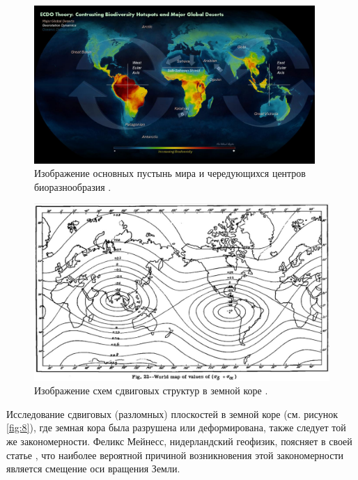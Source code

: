 \documentclass[10pt,twocolumn,letterpaper]{article}
\begin{document}
\begin{figure}[t]
\begin{center}
\includegraphics[width=0.95\textwidth]{biodiversity.jpg}
\end{center}
   \caption{Изображение основных пустынь мира и чередующихся центров биоразнообразия \cite{28}.}
\label{fig:9}
\end{figure}

\begin{figure}[t]
\begin{center}
   \includegraphics[width=1\linewidth]{meinesz3.jpg}
\end{center}
   \caption{Изображение схем сдвиговых структур в земной коре \cite{36}.}
\label{fig:8}
\label{fig:onecol}
\end{figure}

Исследование сдвиговых (разломных) плоскостей в земной коре (см. рисунок \ref{fig:8}), где земная кора была разрушена или деформирована, также следует той же закономерности. Феликс Мейнесс, нидерландский геофизик, поясняет в своей статье \cite{36}, что наиболее вероятной причиной возникновения этой закономерности является смещение оси вращения Земли.
\end{document}
